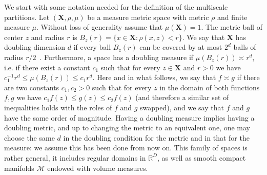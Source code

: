 \documentclass[twoside,11pt]{article}
\newcommand{\Xsp}{{\mathbf{X}}}
\begin{document}
We start with some notation needed for the definition of the
multiscale partitions.  Let $({\Xsp},\rho,\mu)$ be a measure metric space with
metric $\rho$ and finite measure $\mu$. Without loss of generality assume that
$\mu(\Xsp)=1$. The metric ball of center $z$ and radius $r$ is $B_z(r)=\{
x\in{\Xsp} : \rho(x,z)<r\}$. We say that ${\Xsp}$ has doubling dimension $d$ if
every ball $B_z(r)$ can be covered by at most $2^d$ balls of radius
$r/2$~\citep{assouad1983plongements}.  Furthermore, a space has a doubling
measure if $\mu(B_z(r))\asymp r^d$, i.e. if there exist a constant $c_1$ such
that for every $z\in\Xsp$ and $r>0$ we have $c_1^{-1}r^d\le\mu(B_z(r))\le
c_1r^d$.  Here and in what follows, we say that $f\asymp g$ if there are two
constants $c_1,c_2>0$ such that for every $z$ in the domain of both functions
$f,g$ we have $c_1 f(z)\le g(z)\le c_2 f(z)$ (and therefore a similar set of
inequalities holds with the roles of $f$ and $g$ swapped), and we say that $f$
and $g$ have the same order of magnitude.  Having a doubling measure implies
having a doubling metric, and up to changing the metric to an equivalent one,
one may choose the same $d$ in the doubling condition for the metric and in
that for the measure: we assume this has been done from now on.  This family of
spaces is rather general, it includes regular domains in $\mathbb{R}^D$, as
well as smooth compact manifolds $\mathcal{M}$ endowed with volume measures.  
\end{document}

